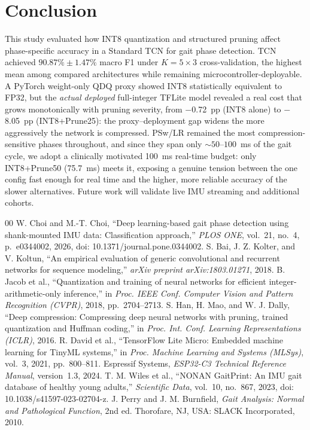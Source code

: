 \documentclass[conference]{IEEEtran}
\begin{document}
\section{Conclusion}
\label{sec:conclusion}

This study evaluated how INT8 quantization and structured pruning affect phase-specific accuracy in
a Standard TCN for gait phase detection. TCN achieved $90.87\%\pm1.47\%$ macro F1 under
$K{=}5\times3$ cross-validation, the highest mean among compared architectures while remaining
microcontroller-deployable. A PyTorch weight-only QDQ proxy showed INT8 statistically equivalent to
FP32, but the \emph{actual deployed} full-integer TFLite model revealed a real cost that grows
monotonically with pruning severity, from $-$0.72~pp (INT8 alone) to $-$8.05~pp (INT8+Prune25): the
proxy--deployment gap widens the more aggressively the network is compressed. PSw/LR remained the
most compression-sensitive phases throughout, and since they span only ${\sim}50$--$100$~ms of the
gait cycle, we adopt a clinically motivated 100~ms real-time budget: only INT8+Prune50 (75.7~ms)
meets it, exposing a genuine tension between the one config fast enough for real time and the
higher, more reliable accuracy of the slower alternatives. Future work will validate live IMU
streaming and additional cohorts.


\begin{thebibliography}{00}
\footnotesize
{} W. Choi and M.-T. Choi, ``Deep learning-based gait phase detection using
shank-mounted IMU data: Classification approach,'' \textit{PLOS ONE}, vol.~21, no.~4, p.~e0344002,
2026, doi: 10.1371/journal.pone.0344002.
 S. Bai, J. Z. Kolter, and V. Koltun, ``An empirical evaluation of generic
convolutional and recurrent networks for sequence modeling,'' \textit{arXiv preprint
arXiv:1803.01271}, 2018.
 B. Jacob et al., ``Quantization and training of neural networks for efficient
integer-arithmetic-only inference,'' in \textit{Proc. IEEE Conf. Computer Vision and Pattern
Recognition (CVPR)}, 2018, pp.~2704--2713.
 S. Han, H. Mao, and W. J. Dally, ``Deep compression: Compressing deep neural
networks with pruning, trained quantization and Huffman coding,'' in \textit{Proc. Int. Conf.
Learning Representations (ICLR)}, 2016.
 R. David et al., ``TensorFlow Lite Micro: Embedded machine learning for TinyML
systems,'' in \textit{Proc. Machine Learning and Systems (MLSys)}, vol.~3, 2021, pp.~800--811.
 Espressif Systems, \textit{ESP32-C3 Technical Reference Manual}, version~1.3, 2024.
 T. M. Wiles et al., ``NONAN GaitPrint: An IMU gait database of healthy young
adults,'' \textit{Scientific Data}, vol.~10, no.~867, 2023, doi: 10.1038/s41597-023-02704-z.
 J. Perry and J. M. Burnfield, \textit{Gait Analysis: Normal and Pathological
Function}, 2nd ed. Thorofare, NJ, USA: SLACK Incorporated, 2010.
\end{thebibliography}
\end{document}
